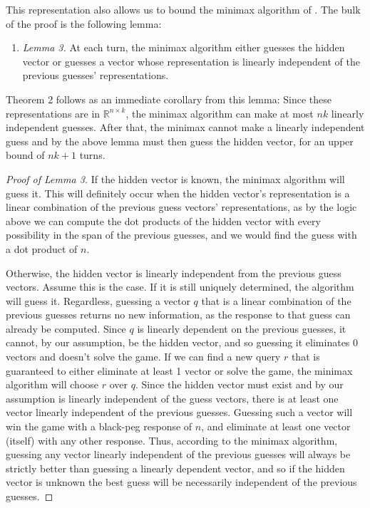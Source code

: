 \documentclass[12pt, a4paper]{article}
\newcommand{\R}{\mathbb{R}}           %
\begin{document}
This representation also allows us to bound the minimax algorithm of \cite{DK76}. The bulk of the proof is the following lemma:
\begin{enumerate}
	\item[] \textit{Lemma 3.} 
	At each turn, the minimax algorithm either guesses the hidden vector or guesses a vector whose representation is linearly independent of the previous guesses' representations.
\end{enumerate}
Theorem 2 follows as an immediate corollary from this lemma: Since these representations are in $\R^{n \times k}$, the minimax algorithm can make at most $nk$ linearly independent guesses. After that, the minimax cannot make a linearly independent guess and by the above lemma must then guess the hidden vector, for an upper bound of $nk+1$ turns.
\begin{proof}[Proof of Lemma 3]
	If the hidden vector is known, the minimax algorithm will guess it. This will definitely occur when the hidden vector's representation is a linear combination of the previous guess vectors' representations, as by the logic above we can compute the dot products of the hidden vector with every possibility in the span of the previous guesses, and we would find the guess with a dot product of $n$.
	
	Otherwise, the hidden vector is linearly independent from the previous guess vectors. Assume this is the case. If it is still uniquely determined, the algorithm will guess it. Regardless, guessing a vector $q$ that is a linear combination of the previous guesses returns no new information, as the response to that guess can already be computed. Since $q$ is linearly dependent on the previous guesses, it cannot, by our assumption, be the hidden vector, and so guessing it eliminates 0 vectors and doesn't solve the game. If we can find a new query $r$ that is guaranteed to either eliminate at least 1 vector or solve the game, the minimax algorithm will choose $r$ over $q$. Since the hidden vector must exist and by our assumption is linearly independent of the guess vectors, there is at least one vector linearly independent of the previous guesses. Guessing such a vector will win the game with a black-peg response of $n$, and eliminate at least one vector (itself) with any other response. Thus, according to the minimax algorithm, guessing any vector linearly independent of the previous guesses will always be strictly better than guessing a linearly dependent vector, and so if the hidden vector is unknown the best guess will be necessarily independent of the previous guesses.
\end{proof}
\end{document}
